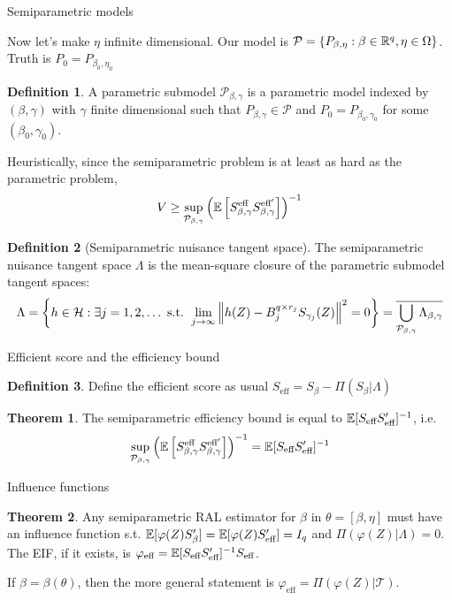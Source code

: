\documentclass[10pt,aspectratio=169,handout]{beamer}
\theoremstyle{definition}
\newtheorem{thm}{Theorem}
\newtheorem{defn}{Definition}
\begin{document}
\begin{frame}{Semiparametric models}
  \small

  Now let's make $\eta$ infinite dimensional. Our model is $\mathcal P = 
  \{P_{\beta,\eta} : \beta \in \mathbb{R}^q, \eta \in \Omega\}$. Truth is $P_0 =
  P_{\beta_0,\eta_0}$
  
  \begin{defn}
    A \alert{parametric submodel} $\mathcal P_{\beta,\gamma}$ is a
    parametric model indexed by $
    (\beta,\gamma)$ with $\gamma$ finite dimensional such that $P_
    {\beta,\gamma} \in \mathcal P$ and $P_0 = P_{\beta_0, \gamma_0}$ for
    some $(\beta_0, \gamma_0)$.
  \end{defn}
  
  Heuristically, since the semiparametric problem is at least as hard as
  the parametric problem, \[
  V \ge \sup_{\mathcal P_{\beta,\gamma}} \left({\mathbb{E}\left[{S_{\beta,\gamma}^
  {\text{eff}} S_{\beta,\gamma}^{\text{eff}'}}\right]}\right)^{-1}
  \]
  
  \begin{defn}[Semiparametric nuisance tangent space]
    The \alert{semiparametric nuisance tangent space} $\Lambda$ is the
    mean-square closure of the parametric submodel tangent spaces: \[
    \Lambda = \left\{{h \in \mathcal H : \exists j = 1,2,\ldots \text{ s.t. }
    \lim_{j\to\infty} \left\lVert h(Z) - B_j^{q\times r_j}S_{\gamma_j}(Z)\right\rVert^2 =
    0}\right\} = \overline{\bigcup_{\mathcal P_{\beta,\gamma}} \Lambda_
    {\beta,\gamma}}
    \]
  \end{defn}
\end{frame}

\begin{frame}{Efficient score and the efficiency bound}
  \begin{defn}
    Define the efficient score as usual $S_\text{eff} = S_\beta - \Pi
    (S_\beta | \Lambda)$
  \end{defn}
  
  \begin{thm}
    The semiparametric efficiency bound is equal to $\mathbb{E}[S_{\text{eff}}
    S_\text{eff}']^
    {-1}$, i.e. \[
    \sup_{\mathcal P_{\beta,\gamma}} \left({\mathbb{E}\left[{S_{\beta,\gamma}^
  {\text{eff}} S_{\beta,\gamma}^{\text{eff}'}}\right]}\right)^{-1} = \mathbb{E}[S_{\text{eff}}
    S_\text{eff}']^
    {-1}
    \]
  \end{thm}
\end{frame}

\begin{frame}{Influence functions}
  \begin{thm}
    Any semiparametric RAL estimator for $\beta$ in $\theta = 
    [\beta,\eta]$ must have an influence
    function s.t. $\mathbb{E}[\varphi(Z) S_\beta'] = \mathbb{E}[\varphi(Z) S'_{
    \text{eff}}] = I_q$ and $\Pi(\varphi(Z) | \Lambda)=  0$.
    The EIF, if it exists, is $\varphi_{\text{eff}} = \mathbb{E}[S_{
    \text{eff}}S'_{
    \text{eff}}]^{-1}S_{
    \text{eff}}$.
    
    If $\beta = \beta(\theta)$, then the more general statement is
    $\varphi_{\text{eff}} = \Pi(\varphi(Z) | \mathcal T)$.
  \end{thm}
\end{frame}
\end{document}
